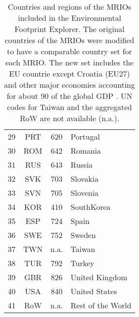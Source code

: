 \begin{table}
\begin{tabular}{ c c c l }
29&PRT & 620 & Portugal\\
30&ROM & 642 & Romania\\
31&RUS & 643 & Russia\\
32&SVK & 703 & Slovakia\\
33&SVN & 705 & Slovenia\\
34&KOR & 410 & SouthKorea\\
35&ESP & 724 & Spain\\
36&SWE & 752 & Sweden\\
37&TWN & n.a. & Taiwan\\
38&TUR & 792 & Turkey\\
39&GBR & 826 & United Kingdom\\
40&USA & 840 & United States\\
41& RoW & n.a. & Rest of the World\\
\end{tabular}
\caption{Countries and regions of the MRIOs included in the Environmental Footprint Explorer. 
The original countries of the MRIOs were modified to have a comparable country set for each MRIO. The new set includes the EU countrie except Croatia (EU27) and other major economies accounting for about 90 of the global GDP \cite{Stadler_2014}. UN codes for Taiwan and the aggregated RoW are not available (n.a.).}
\end{table}



